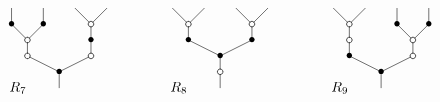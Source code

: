 \documentclass[../main.tex]{subfiles}
\begin{document}
\begin{ex}
    $$
        \xy
        <0.08cm, 0cm>:
        (0.0, 0.0)*{}="1"; %
        (0.0, 5.0)*=0{\bullet}="2"; %
        (-10.0, 10.0)*\cir<2pt>{}="3"; %
        (-10.0, 15.0)*\cir<2pt>{}="4"; %
        (-15.0, 20.0)*=0{\bullet}="5"; %
        (-15.0, 25.0)*{}="6"; %
        (-5.0, 20.0)*=0{\bullet}="7"; %
        (-5.0, 25.0)*{}="8"; %
        (10.0, 10.0)*\cir<2pt>{}="9"; %
        (10.0, 15.0)*=0{\bullet}="10"; %
        (10.0, 20.0)*\cir<2pt>{}="11"; %
        (5.0, 25.0)*{}="12"; %
        (15.0, 25.0)*{}="13"; %
        "1";"2" **\dir{-};
        "2";"3" **\dir{-};
        "3";"4" **\dir{-};
        "4";"5" **\dir{-};
        "5";"6" **\dir{-};
        "4";"7" **\dir{-};
        "7";"8" **\dir{-};
        "2";"9" **\dir{-};
        "9";"10" **\dir{-};
        "10";"11" **\dir{-};
        "11";"12" **\dir{-};
        "11";"13" **\dir{-};
        (-13,0)*{R_{7}};
        \endxy
        \xy
        <0.08cm, 0cm>:
        (-10, 0.0)*{}="1";
        (10, 10.0)*{}="2";
        \endxy
        \xy
        <0.08cm, 0cm>:
        (0.0, 0.0)*{}="1"; %
        (0.0, 5.0)*\cir<2pt>{}="2"; %
        (0.0, 10.0)*=0{\bullet}="3"; %
        (-10.0, 15.0)*=0{\bullet}="4"; %
        (-10.0, 20.0)*\cir<2pt>{}="5"; %
        (-15.0, 25.0)*{}="6"; %
        (-5.0, 25.0)*{}="7"; %
        (10.0, 15.0)*=0{\bullet}="8"; %
        (10.0, 20.0)*\cir<2pt>{}="9"; %
        (5.0, 25.0)*{}="10"; %
        (15.0, 25.0)*{}="11"; %
        "1";"2" **\dir{-};
        "2";"3" **\dir{-};
        "3";"4" **\dir{-};
        "4";"5" **\dir{-};
        "5";"6" **\dir{-};
        "5";"7" **\dir{-};
        "3";"8" **\dir{-};
        "8";"9" **\dir{-};
        "9";"10" **\dir{-};
        "9";"11" **\dir{-};
        (-13,0)*{R_{8}};
        \endxy
        \xy
        <0.08cm, 0cm>:
        (-10, 0.0)*{}="1";
        (10, 10.0)*{}="2";
        \endxy
        \xy
        <0.08cm, 0cm>:
        (0.0, 0.0)*{}="1"; %
        (0.0, 5.0)*=0{\bullet}="2"; %
        (-10.0, 10.0)*=0{\bullet}="3"; %
        (-10.0, 15.0)*\cir<2pt>{}="4"; %
        (-10.0, 20.0)*\cir<2pt>{}="5"; %
        (-15.0, 25.0)*{}="6"; %
        (-5.0, 25.0)*{}="7"; %
        (10.0, 10.0)*\cir<2pt>{}="8"; %
        (10.0, 15.0)*\cir<2pt>{}="9"; %
        (5.0, 20.0)*=0{\bullet}="10"; %
        (5.0, 25.0)*{}="11"; %
        (15.0, 20.0)*=0{\bullet}="12"; %
        (15.0, 25.0)*{}="13"; %
        "1";"2" **\dir{-};
        "2";"3" **\dir{-};
        "3";"4" **\dir{-};
        "4";"5" **\dir{-};
        "5";"6" **\dir{-};
        "5";"7" **\dir{-};
        "2";"8" **\dir{-};
        "8";"9" **\dir{-};
        "9";"10" **\dir{-};
        "10";"11" **\dir{-};
        "9";"12" **\dir{-};
        "12";"13" **\dir{-};
        (-13,0)*{R_{9}};
        \endxy
        \xy
        <0.08cm, 0cm>:
        (-10, 0.0)*{}="1";
        (10, 10.0)*{}="2";
        \endxy
    $$


\end{ex}
\end{document}
